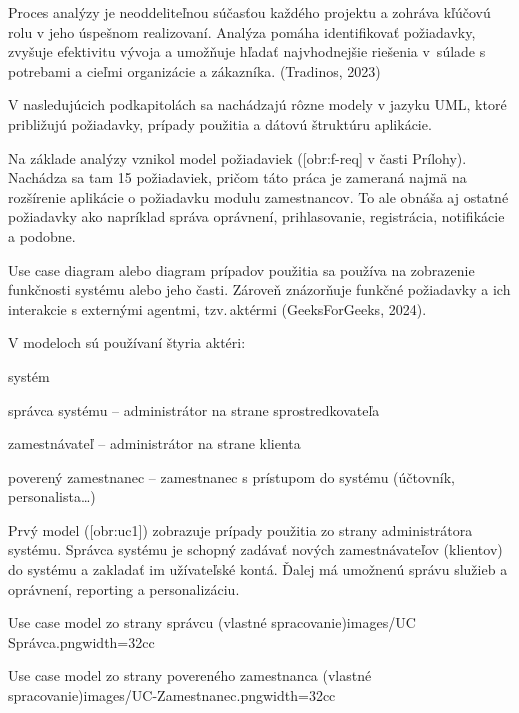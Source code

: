 Proces analýzy je neoddeliteľnou súčasťou každého projektu a zohráva kľúčovú rolu v jeho úspešnom realizovaní. Analýza pomáha identifikovať požiadavky, zvyšuje efektivitu vývoja a umožňuje hľadať najvhodnejšie riešenia v~súlade s potrebami a cieľmi organizácie a zákazníka. (Tradinos, 2023)

V nasledujúcich podkapitolách sa nachádzajú rôzne modely v jazyku UML, ktoré približujú požiadavky, prípady použitia a dátovú štruktúru aplikácie.

Na základe analýzy vznikol model požiadaviek ([obr:f-req] v časti Prílohy). Nachádza sa tam 15 požiadaviek, pričom táto práca je zameraná najmä na rozšírenie aplikácie o požiadavku modulu zamestnancov. To ale obnáša aj ostatné požiadavky ako napríklad správa oprávnení, prihlasovanie, registrácia, notifikácie a podobne.


Use case diagram alebo diagram prípadov použitia sa používa na zobrazenie funkčnosti systému alebo jeho časti. Zároveň znázorňuje funkčné požiadavky a ich interakcie s externými agentmi, tzv.\,aktérmi \scr(GeeksForGeeks, 2024).

\blank
V modeloch sú používaní štyria aktéri:

\startitemize
\item{systém}
\item{správca systému -- administrátor na strane sprostredkovateľa}
\item{zamestnávateľ -- administrátor na strane klienta}
\item{poverený zamestnanec -- zamestnanec s prístupom do systému (účtovník, personalista\dots)}
\stopitemize 

Prvý model ([obr:uc1]) zobrazuje prípady použitia zo strany administrátora systému.  Správca systému je schopný zadávať nových zamestnávateľov (klientov) do systému a zakladať im užívateľské kontá. Ďalej má umožnenú správu služieb a oprávnení, reporting a personalizáciu.

{Use case model zo strany správcu (vlastné spracovanie)}{images/UC Správca.png}{width=32cc}


{Use case model zo strany povereného zamestnanca (vlastné spracovanie)}{images/UC-Zamestnanec.png}{width=32cc}

